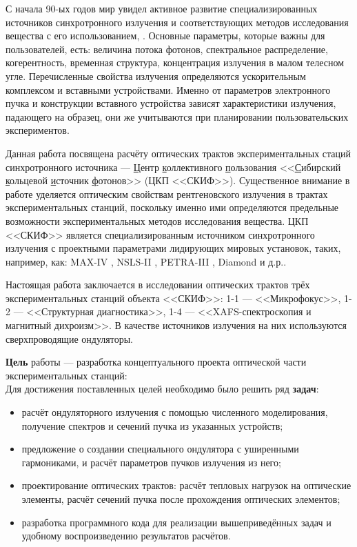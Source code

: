 {\actuality}
С начала 90-ых годов мир увидел активное развитие специализированных источников синхротронного излучения и соответствующих методов исследования вещества с его использованием, \cite{willmott2019introduction}. Основные параметры, которые важны для пользователей, есть: величина потока фотонов, спектральное распределение, когерентность, временная структура, концентрация излучения в малом телесном угле. Перечисленные свойства излучения определяются ускорительным комплексом и вставными устройствами. Именно от параметров электронного пучка и конструкции вставного устройства зависят характеристики излучения, падающего на образец, они же учитываются при планировании пользовательских экспериментов.

Данная работа посвящена расчёту оптических трактов экспериментальных стаций синхротронного источника --- \underline{Ц}ентр \underline{к}оллективного \underline{п}ользования <<\underline{С}ибирский \underline{к}ольцевой \underline{и}сточник \underline{ф}отонов>> (ЦКП <<СКИФ>>). 
Существенное внимание в работе уделяется оптическим свойствам рентгеновского излучения в трактах экспериментальных станций, поскольку именно ими определяются предельные возможности экспериментальных методов исследования вещества. ЦКП <<СКИФ>> является специализированным источником синхротронного излучения с проектными параметрами лидирующих мировых установок\cite{zorin2019radiation}, таких, например, как: MAX-IV \cite{max2010max}, NSLS-II \cite{NSLS}, PETRA-III \cite{balewski2004petra}, Diamond \cite{DIAMOND} и д.р..

Настоящая работа заключается в исследовании оптических трактов трёх экспериментальных станций объекта <<СКИФ>>: 1-1 --- <<Микрофокус>>, 1-2 --- <<Структурная диагностика>>, 1-4 --- <<XAFS-спектроскопия и магнитный дихроизм>>. В качестве источников излучения на них используются сверхпроводящие ондуляторы. 

\textbf{Цель} работы --- разработка концептуального проекта оптической части экспериментальных станций:\\
Для достижения поставленных целей необходимо было решить ряд \textbf{задач}:
\begin{itemize}
	\item расчёт ондуляторного излучения с помощью численного моделирования, получение спектров и сечений пучка из указанных устройств;
	\item предложение о создании специального ондулятора с уширенными гармониками, и расчёт параметров пучков излучения из него;
	\item проектирование оптических трактов: расчёт тепловых нагрузок на оптические элементы, расчёт сечений пучка после прохождения оптических элементов;
	\item разработка программного кода для реализации вышеприведённых задач и удобному воспроизведению результатов расчётов.
\end{itemize}

